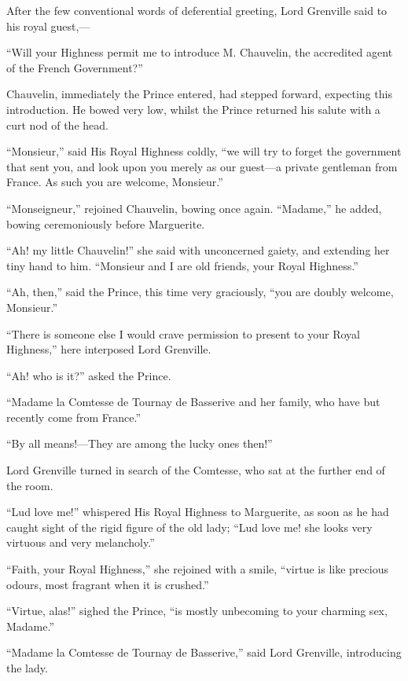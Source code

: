 \documentclass[paper=a5,BCOR=7mm,twoside,DIV=calc,12pt,usegeometry,chapterprefix,endperiod,headings=big]{scrbook}
\begin{document}
After the few conventional words of deferential greeting, Lord Grenville said to his royal guest,---

\enquote{Will your Highness permit me to introduce M. Chauvelin, the accredited agent of the French Government?}

Chauvelin, immediately the Prince entered, had stepped forward, expecting this introduction. He bowed very low, whilst the Prince returned his salute with a curt nod of the head.

\enquote{Monsieur,} said His Royal Highness coldly, \enquote{we will try to forget the government that sent you, and look upon you merely as our guest---a private gentleman from France. As such you are welcome, Monsieur.}

\enquote{Monseigneur,} rejoined Chauvelin, bowing once again. \enquote{Madame,} he added, bowing ceremoniously before Marguerite.

\enquote{Ah! my little Chauvelin!} she said with unconcerned gaiety, and extending her tiny hand to him. \enquote{Monsieur and I are old friends, your Royal Highness.}

\enquote{Ah, then,} said the Prince, this time very graciously, \enquote{you are doubly welcome, Monsieur.}

\enquote{There is someone else I would crave permission to present to your Royal Highness,} here interposed Lord Grenville.

\enquote{Ah! who is it?} asked the Prince.

\enquote{Madame la Comtesse de Tournay de Basserive and her family, who have but recently come from France.}

\enquote{By all means!---They are among the lucky ones then!}

Lord Grenville turned in search of the Comtesse, who sat at the further end of the room.

\enquote{Lud love me!} whispered His Royal Highness to Marguerite, as soon as he had caught sight of the rigid figure of the old lady; \enquote{Lud love me! she looks very virtuous and very melancholy.}

\enquote{Faith, your Royal Highness,} she rejoined with a smile, \enquote{virtue is like precious odours, most fragrant when it is crushed.}

\enquote{Virtue, alas!} sighed the Prince, \enquote{is mostly unbecoming to your charming sex, Madame.}

\enquote{Madame la Comtesse de Tournay de Basserive,} said Lord Grenville, introducing the lady.
\end{document}
